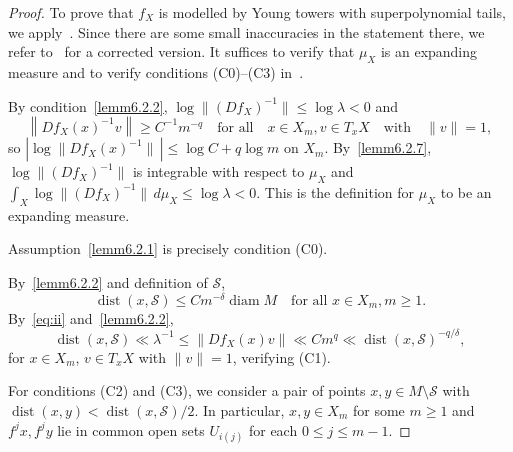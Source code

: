 \documentclass[AHL,Unicode,longabstracts,published]{cedram}
\newcommand{\cS}{\mathcal{S}}
\DeclareMathOperator{\diam}{diam}
\DeclareMathOperator{\dist}{dist}
\begin{document}
\begin{proof}
To prove that $f_X$ is modelled by Young towers with superpolynomial tails, we apply~\cite[Theorem~C]{AFLV11}. Since there are some small inaccuracies in the statement there, we refer to~\cite[Theorem~A.1]{AraujoMsub} for a corrected version. It suffices to verify that $\mu_X$ is an expanding measure and to verify conditions (C0)--(C3) in~\cite[Appendix~A]{AraujoMsub}.

By condition~\eqref{lemm6.2.2}, $\log \|(Df_X)^{-1}\|\le\log\lambda<0$ and
\begin{equation}\label{eq:iv}
\left\|Df_X(x)^{-1}v\right\|\ge C^{-1}m^{-q}
\quad\text{for all}\quad x\in X_m, v\in T_xX\quad\text{with}\quad\|v\|=1,
\end{equation}
so $|\log \|Df_X(x)^{-1}\|\,|\le \log C+q\log m$ on $X_m$. By~\eqref{lemm6.2.7}, $\log \|(Df_X)^{-1}\|$ is integrable with respect to $\mu_X$ and $\int_X \log \|(Df_X)^{-1}\|\,d\mu_X\le\log\lambda<0$. This is the definition for $\mu_X$ to be an expanding measure.

Assumption~\eqref{lemm6.2.1} is precisely condition (C0).

By~\eqref{lemm6.2.2} and definition of $\cS$,
\begin{equation}\label{eq:ii}
\dist(x,\cS)\le Cm^{-\delta}\diam M
\quad\text{for all }x\in X_m, m\ge1.
\end{equation}
By~\eqref{eq:ii} and~\eqref{lemm6.2.2},
\[
\dist(x,\cS)\ll \lambda^{-1}\le \left\|Df_X(x)v\right\|\ll Cm^q\ll \dist(x,\cS)^{-q/\delta},
\]
for $x\in X_m$, $v\in T_xX$ with $\|v\|=1$, verifying (C1).

For conditions (C2) and (C3), we consider a pair of points $x,y\in M\setminus\cS$ with $\dist(x,y)<\dist(x,\cS)/2$. In particular, $x,y\in X_m$ for some $m\ge1$ and $f^jx,f^jy$ lie in common open sets $U_{i(j)}$ for each $0\le j\le m-1$.


\end{proof}
\end{document}
